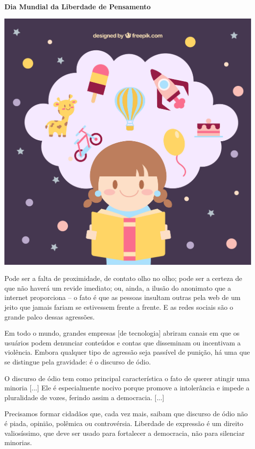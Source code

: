 \begin{myquote}
\textbf{Dia Mundial da Liberdade de Pensamento}

\begin{center}
\includegraphics[width=\textwidth]{media/image28a.jpeg}
\end{center}

Pode ser a falta de proximidade, de contato olho no olho; pode ser a
certeza de que não haverá um revide imediato; ou, ainda, a ilusão do
anonimato que a internet proporciona -- o fato é que as pessoas insultam
outras pela web de um jeito que jamais fariam se estivessem frente a
frente. E as redes sociais são o grande palco dessas agressões.

Em todo o mundo, grandes empresas [de tecnologia]
abriram canais em que os usuários podem denunciar conteúdos e contas que
disseminam ou incentivam a violência. Embora qualquer tipo de agressão
seja passível de punição, há uma que se distingue pela gravidade: é o
discurso de ódio.

O discurso de ódio tem como principal característica o fato de querer
atingir uma minoria {[}...{]} Ele é especialmente nocivo porque promove
a intolerância e impede a pluralidade de vozes, ferindo assim
a democracia. {[}...{]}

Precisamos formar cidadãos que, cada vez mais, saibam que discurso de
ódio não é piada, opinião, polêmica ou controvérsia. Liberdade de
expressão é um direito valiosíssimo, que deve ser usado para fortalecer
a democracia, não para silenciar minorias.

\end{myquote}

